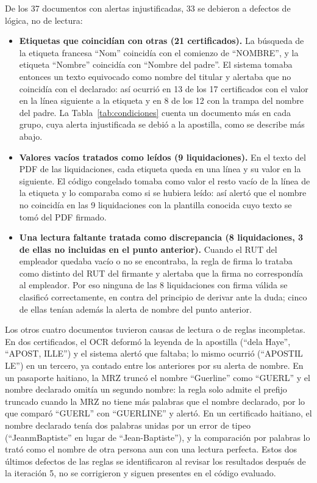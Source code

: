 \documentclass[11pt,a4paper]{article}
\begin{document}
De los 37 documentos con alertas injustificadas, 33 se debieron a defectos de lógica, no de lectura:
\begin{itemize}
  \item \textbf{Etiquetas que coincidían con otras (21 certificados).} La búsqueda de la etiqueta francesa ``Nom'' coincidía con el comienzo de ``NOMBRE'', y la etiqueta ``Nombre'' coincidía con ``Nombre del padre''. El sistema tomaba entonces un texto equivocado como nombre del titular y alertaba que no coincidía con el declarado: así ocurrió en 13 de los 17 certificados con el valor en la línea siguiente a la etiqueta y en 8 de los 12 con la trampa del nombre del padre. La Tabla~\ref{tab:condiciones} cuenta un documento más en cada grupo, cuya alerta injustificada se debió a la apostilla, como se describe más abajo.
  \item \textbf{Valores vacíos tratados como leídos (9 liquidaciones).} En el texto del PDF de las liquidaciones, cada etiqueta queda en una línea y su valor en la siguiente. El código congelado tomaba como valor el resto vacío de la línea de la etiqueta y lo comparaba como si se hubiera leído: así alertó que el nombre no coincidía en las 9 liquidaciones con la plantilla conocida cuyo texto se tomó del PDF firmado.
  \item \textbf{Una lectura faltante tratada como discrepancia (8 liquidaciones, 3 de ellas no incluidas en el punto anterior).} Cuando el RUT del empleador quedaba vacío o no se encontraba, la regla de firma lo trataba como distinto del RUT del firmante y alertaba que la firma no correspondía al empleador. Por eso ninguna de las 8 liquidaciones con firma válida se clasificó correctamente, en contra del principio de derivar ante la duda; cinco de ellas tenían además la alerta de nombre del punto anterior.
\end{itemize}

Los otros cuatro documentos tuvieron causas de lectura o de reglas incompletas. En dos certificados, el OCR deformó la leyenda de la apostilla (``dela Haye'', ``APOST, ILLE'') y el sistema alertó que faltaba; lo mismo ocurrió (``APOSTIL LE'') en un tercero, ya contado entre los anteriores por su alerta de nombre. En un pasaporte haitiano, la MRZ truncó el nombre ``Guerline'' como ``GUERL'' y el nombre declarado omitía un segundo nombre: la regla solo admite el prefijo truncado cuando la MRZ no tiene más palabras que el nombre declarado, por lo que comparó ``GUERL'' con ``GUERLINE'' y alertó. En un certificado haitiano, el nombre declarado tenía dos palabras unidas por un error de tipeo (``JeanmBaptiste'' en lugar de ``Jean-Baptiste''), y la comparación por palabras lo trató como el nombre de otra persona aun con una lectura perfecta. Estos dos últimos defectos de las reglas se identificaron al revisar los resultados después de la iteración 5, no se corrigieron y siguen presentes en el código evaluado.
\end{document}
